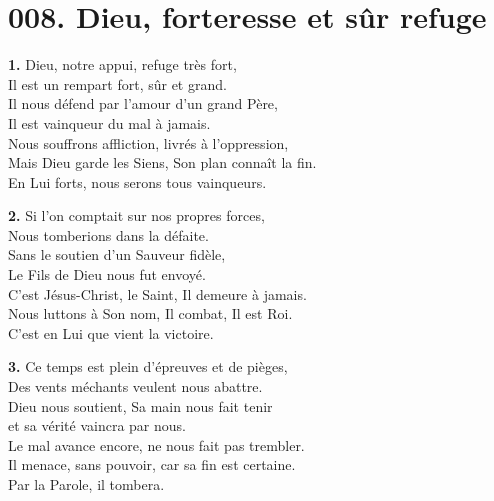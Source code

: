 \documentclass[]{article}
\begin{document}
\hypertarget{h008}{}
\section*{008. Dieu, forteresse et sûr refuge}
\label{h:008}

\vspace{-0.8em}

\vspace{0.8em}
\medskip
\noindent\textbf{1.} Dieu, notre appui, refuge très fort,\\
Il est un rempart fort, sûr et grand.\\
Il nous défend par l'amour d'un grand Père,\\
Il est vainqueur du mal à jamais.\\
Nous souffrons affliction, livrés à l'oppression,\\
Mais Dieu garde les Siens, Son plan connaît la fin.\\
En Lui forts, nous serons tous vainqueurs.

\medskip
\noindent\textbf{2.} Si l'on comptait sur nos propres forces,\\
Nous tomberions dans la défaite.\\
Sans le soutien d'un Sauveur fidèle,\\
Le Fils de Dieu nous fut envoyé.\\
C'est Jésus-Christ, le Saint, Il demeure à jamais.\\
Nous luttons à Son nom, Il combat, Il est Roi.\\
C'est en Lui que vient la victoire.

\medskip
\noindent\textbf{3.} Ce temps est plein d'épreuves et de pièges,\\
Des vents méchants veulent nous abattre.\\
Dieu nous soutient, Sa main nous fait tenir\\
et sa vérité vaincra par nous.\\
Le mal avance encore, ne nous fait pas trembler.\\
Il menace, sans pouvoir, car sa fin est certaine.\\
Par la Parole, il tombera.
\end{document}
